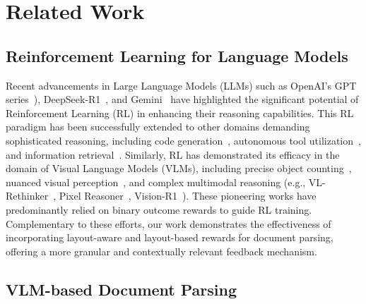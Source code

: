 












\section{Related Work}

\subsection{Reinforcement Learning for Language Models}

Recent advancements in Large Language Models (LLMs) such as OpenAI's GPT series~\citep{openai2024gpt4ocard}), DeepSeek-R1~\citep{guo2025deepseek}, and Gemini~\citep{gemini} have highlighted the significant potential of Reinforcement Learning (RL) in enhancing their reasoning capabilities. This RL paradigm has been successfully extended to other domains demanding sophisticated reasoning, including code generation~\citep{alphacode, zeng2025acecoder}, autonomous tool utilization~\citep{toolformer, autocode}, and information retrieval~\citep{webgpt}. Similarly, RL has demonstrated its efficacy in the domain of Visual Language Models (VLMs), including precise object counting~\citep{peng2025skywork}, nuanced visual perception~\citep{liu2025visual}, and complex multimodal reasoning (e.g., VL-Rethinker~\citep{vlrethinker}, Pixel Reasoner~\citep{su2025pixel}, Vision-R1~\citep{huang2025visionr1}). These pioneering works have predominantly relied on binary outcome rewards to guide RL training. Complementary to these efforts, our work demonstrates the effectiveness of incorporating layout-aware and layout-based rewards for document parsing, offering a more granular and contextually relevant feedback mechanism. 



\subsection{VLM-based Document Parsing}

